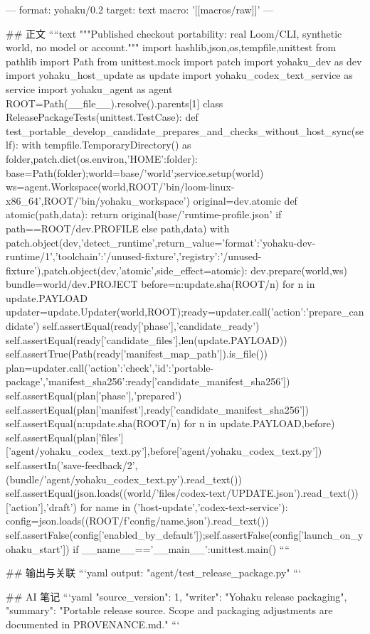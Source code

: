 ---
format: yohaku/0.2
target: text
macro: '[[macros/raw]]'
---

## 正文
````text
"""Published checkout portability: real Loom/CLI, synthetic world, no model or account."""
import hashlib,json,os,tempfile,unittest
from pathlib import Path
from unittest.mock import patch
import yohaku_dev as dev
import yohaku_host_update as update
import yohaku_codex_text_service as service
import yohaku_agent as agent
ROOT=Path(__file__).resolve().parents[1]
class ReleasePackageTests(unittest.TestCase):
 def test_portable_develop_candidate_prepares_and_checks_without_host_sync(self):
  with tempfile.TemporaryDirectory() as folder,patch.dict(os.environ,{'HOME':folder}):
   base=Path(folder);world=base/'world';service.setup(world)
   ws=agent.Workspace(world,ROOT/'bin/loom-linux-x86_64',ROOT/'bin/yohaku_workspace')
   original=dev.atomic
   def atomic(path,data):
    return original(base/'runtime-profile.json' if path==ROOT/dev.PROFILE else path,data)
   with patch.object(dev,'detect_runtime',return_value={'format':'yohaku-dev-runtime/1','toolchain':'/unused-fixture','registry':'/unused-fixture'}),patch.object(dev,'atomic',side_effect=atomic):
    dev.prepare(world,ws)
   bundle=world/dev.PROJECT
   before={n:update.sha(ROOT/n) for n in update.PAYLOAD}
   updater=update.Updater(world,ROOT);ready=updater.call({'action':'prepare_candidate'})
   self.assertEqual(ready['phase'],'candidate_ready')
   self.assertEqual(ready['candidate_files'],len(update.PAYLOAD))
   self.assertTrue(Path(ready['manifest_map_path']).is_file())
   plan=updater.call({'action':'check','id':'portable-package','manifest_sha256':ready['candidate_manifest_sha256']})
   self.assertEqual(plan['phase'],'prepared')
   self.assertEqual(plan['manifest'],ready['candidate_manifest_sha256'])
   self.assertEqual({n:update.sha(ROOT/n) for n in update.PAYLOAD},before)
   self.assertEqual(plan['files']['agent/yohaku_codex_text.py'],before['agent/yohaku_codex_text.py'])
   self.assertIn('save-feedback/2',(bundle/'agent/yohaku_codex_text.py').read_text())
   self.assertEqual(json.loads((world/'files/codex-text/UPDATE.json').read_text())['action'],'draft')
   for name in ('host-update','codex-text-service'):
    config=json.loads((ROOT/f'config/{name}.json').read_text())
    self.assertFalse(config['enabled_by_default']);self.assertFalse(config['launch_on_yohaku_start'])
if __name__=='__main__':unittest.main()
````

## 输出与关联
```yaml
output: "agent/test_release_package.py"
```

## AI 笔记
```yaml
{"source_version": 1, "writer": "Yohaku release packaging", "summary": "Portable release source. Scope and packaging adjustments are documented in PROVENANCE.md."}
```
